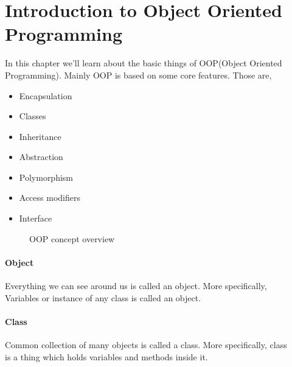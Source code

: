 \documentclass[openany]{book}  %
\begin{document}
% 
% 
\chapter{Introduction to Object Oriented Programming}
In this chapter we'll learn about the basic things of OOP(Object Oriented \\
Programming). Mainly OOP is based on some core features. Those are,
\begin{itemize}
    \item Encapsulation
    \item Classes
    \item Inheritance
    \item Abstraction
    \item Polymorphism
    \item Access modifiers
    \item Interface
\end{itemize}
% 
% 
\begin{figure}[htbp]
    \begin{center}
        \caption{OOP concept overview}
    \end{center}
\end{figure}

\newpage

% 
% 
\subsubsection{Object}
Everything we can see around us is called an object. More specifically, \\
Variables or instance of any class is called an object.
% 
% 
\subsubsection{Class}
Common collection of many objects is called a class. More specifically, class \\
is a thing which holds variables and methods inside it.
% 
% 
\end{document}

